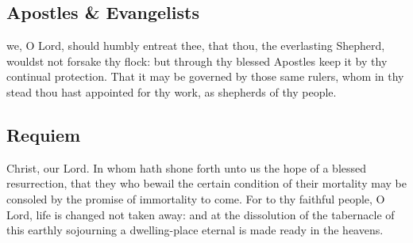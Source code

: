 \begin{multicols}{2}
\subsection{Apostles \& Evangelists}
\noindent
{} we, O Lord, should humbly entreat thee, that thou, the everlasting Shepherd, wouldst not forsake thy flock: but through thy blessed Apostles keep it by thy continual protection. That it may be governed by those same rulers, whom in thy stead thou hast appointed for thy work, as shepherds of thy people.

\subsection{Requiem}
\noindent
{} Christ, our Lord. In whom hath shone forth unto us the hope of a blessed resurrection, that they who bewail the certain condition of their mortality may be consoled by the promise of immortality to come. For to thy faithful people, O Lord, life is changed not taken away: and at the dissolution of the tabernacle of this earthly sojourning a dwelling-place eternal is made ready in the heavens.
\end{multicols}